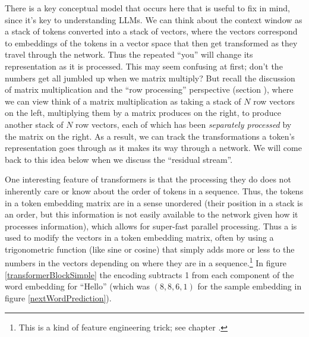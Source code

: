 There is a key conceptual model that occurs here that is useful to fix in mind, since it's key to understanding LLMs. We can think about the context window as a stack of tokens converted into a stack of vectors, where the vectors correspond to embeddings of the tokens in a vector space that then get transformed as they travel through the network. Thus the repeated ``you'' will change its representation as it is processed. This may seem confusing at first; don't the numbers get all jumbled up when we matrix multiply? But recall the discussion of matrix multiplication and the ``row processing'' perspective (section ), where we can view think of a matrix multiplication as taking a stack of $N$ row vectors on the left, multiplying them by a matrix produces on the right, to produce another stack of $N$ row vectors, each of which has been \emph{separately processed} by the matrix on the right. As a result, we can track the transformations a token's representation goes through as it makes its way through a network.  We will come back to this idea below when we discuss the ``residual stream''. 


One interesting feature of transformers is that the processing they do does not inherently care or know about the order of tokens in a sequence. Thus, the tokens in a token embedding matrix are in a sense unordered (their position in a stack is an order, but this information is not easily available to the network given how it processes information), which allows for super-fast parallel processing. Thus a  is used to modify the vectors in a token embedding matrix, often by using a trigonometric function (like sine or cosine) that simply adds more or less to the numbers in the vectors depending on where they are in a sequence.\footnote{This is a kind of feature engineering trick; see chapter .}  In figure \ref{transformerBlockSimple} the encoding subtracts 1 from each component of the word embedding for ``Hello'' (which was $(8,8,6,1)$ for the sample embedding in figure \ref{nextWordPrediction}).
  

